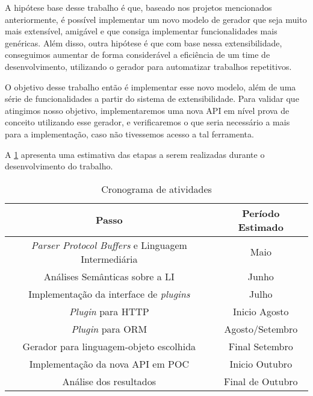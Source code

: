A hipótese base desse trabalho é que, baseado nos projetos mencionados anteriormente,
é possível implementar um novo modelo de gerador que seja muito mais extensível, amigável
e que consiga implementar funcionalidades mais genéricas. Além disso, outra hipótese
é que com base nessa extensibilidade, conseguimos aumentar de forma considerável a
eficiência de um time de desenvolvimento, utilizando o gerador para automatizar
trabalhos repetitivos.

O objetivo desse trabalho então é implementar esse novo modelo, além de uma série de
funcionalidades a partir do sistema de extensibilidade. Para validar que atingimos nosso
objetivo, implementaremos uma nova API em nível prova de conceito utilizando esse gerador,
e verificaremos o que seria necessário a mais para a implementação, caso não tivessemos
acesso a tal ferramenta.

A \cref{tbl:cronograma} apresenta uma estimativa das etapas a serem realizadas durante
o desenvolvimento do trabalho.

\begin{table}[ht]
\centering
\begin{tabular}{c | c}
Passo & Período Estimado \\
\hline
\textit{Parser Protocol Buffers} e Linguagem Intermediária & Maio \\
Análises Semânticas sobre a LI & Junho \\
Implementação da interface de \textit{plugins} & Julho \\
\textit{Plugin} para HTTP & Inicio Agosto \\
\textit{Plugin} para ORM & Agosto/Setembro \\
Gerador para linguagem-objeto escolhida & Final Setembro \\
Implementação da nova API em POC & Inicio Outubro \\
Análise dos resultados & Final de Outubro
\end{tabular}
\caption{Cronograma de atividades}
\label{tbl:cronograma}
\end{table}

